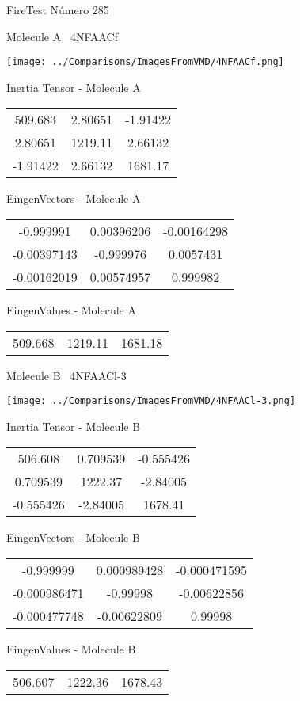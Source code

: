 \vtab[-3cm]
\begin{center}
{\large FireTest \tab Número 285}
\end{center}
\begin{multicols}{2}
\begin{center}

Molecule A \
4NFAACf

\texttt{[image: ../Comparisons/ImagesFromVMD/4NFAACf.png]}

Inertia Tensor - Molecule A \\
\begin{tabular}{|c c c|}
509.683	 & 	2.80651	 & 	-1.91422	 \\
2.80651	 & 	1219.11	 & 	2.66132	 \\
-1.91422	 & 	2.66132	 & 	1681.17
\end{tabular}

\vtab
 EingenVectors - Molecule A     \\
\begin{tabular}{|c c c|}
-0.999991	 & 	0.00396206	 & 	-0.00164298	 \\
-0.00397143	 & 	-0.999976	 & 	0.0057431	 \\
-0.00162019	 & 	0.00574957	 & 	0.999982
\end{tabular}

\vtab
 EingenValues - Molecule A     \\
\begin{tabular}{|c c c|}
509.668	 & 	1219.11	 & 	1681.18	 \\
\end{tabular}
\columnbreak

Molecule B \
4NFAACl-3

\texttt{[image: ../Comparisons/ImagesFromVMD/4NFAACl-3.png]}

Inertia Tensor - Molecule B \\
\begin{tabular}{|c c c|}
506.608	 & 	0.709539	 & 	-0.555426	 \\
0.709539	 & 	1222.37	 & 	-2.84005	 \\
-0.555426	 & 	-2.84005	 & 	1678.41
\end{tabular}

\vtab
 EingenVectors - Molecule B     \\
\begin{tabular}{|c c c|}
-0.999999	 & 	0.000989428	 & 	-0.000471595	 \\
-0.000986471	 & 	-0.99998	 & 	-0.00622856	 \\
-0.000477748	 & 	-0.00622809	 & 	0.99998
\end{tabular}

\vtab
 EingenValues - Molecule B     \\
\begin{tabular}{|c c c|}
506.607	 & 	1222.36	 & 	1678.43	 \\
\end{tabular}

\end{center}
\end{multicols}

